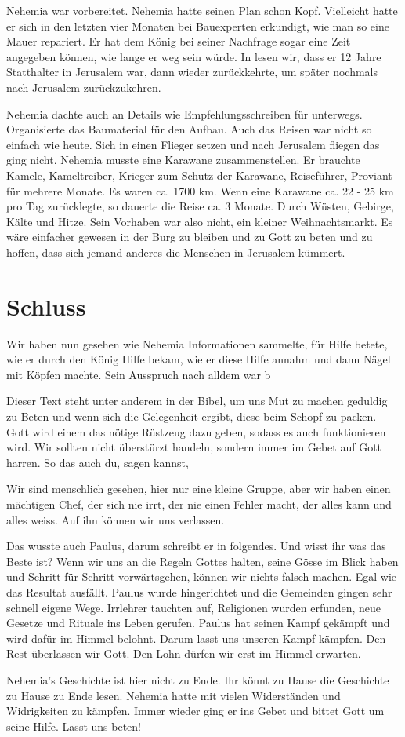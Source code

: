 \documentclass[fontsize=16pt]{mybib}
\begin{document}
Nehemia war vorbereitet. Nehemia hatte seinen Plan schon Kopf. Vielleicht hatte er sich in den letzten vier Monaten bei Bauexperten erkundigt, wie man so eine Mauer repariert. Er hat dem König bei seiner Nachfrage sogar eine Zeit angegeben können, wie lange er weg sein würde. In  lesen wir, dass er 12 Jahre Statthalter in Jerusalem war, dann wieder zurückkehrte, um später nochmals nach Jerusalem zurückzukehren.

Nehemia dachte auch an Details wie Empfehlungsschreiben für unterwegs. Organisierte das Baumaterial für den Aufbau. Auch das Reisen war nicht so einfach wie heute. Sich in einen Flieger setzen und nach Jerusalem fliegen das ging nicht. Nehemia musste eine Karawane zusammenstellen. Er brauchte Kamele, Kameltreiber,  Krieger zum Schutz der Karawane, Reiseführer, Proviant für mehrere Monate. Es waren ca. 1700 km. Wenn eine Karawane ca. 22 - 25 km pro Tag zurücklegte, so dauerte die Reise ca. 3 Monate. Durch Wüsten, Gebirge, Kälte und Hitze.
Sein Vorhaben war also nicht, ein kleiner Weihnachtsmarkt. Es wäre einfacher gewesen in der Burg zu bleiben und zu Gott zu beten und zu hoffen, dass sich jemand anderes die Menschen in Jerusalem kümmert.

\section{Schluss}


Wir haben nun gesehen wie Nehemia Informationen sammelte, für Hilfe betete, wie er durch den König Hilfe bekam, wie er diese Hilfe annahm und dann Nägel mit Köpfen machte. Sein Ausspruch nach alldem war b 

Dieser Text steht unter anderem in der Bibel, um uns Mut zu machen geduldig zu Beten und wenn sich die Gelegenheit ergibt, diese beim Schopf zu packen. Gott wird einem das nötige Rüstzeug dazu geben, sodass es auch funktionieren wird. Wir sollten nicht überstürzt handeln, sondern immer im Gebet auf Gott harren. So das auch du, sagen kannst, 

Wir sind menschlich gesehen, hier nur eine kleine Gruppe, aber wir haben einen mächtigen Chef, der sich nie irrt, der nie einen Fehler macht, der alles kann und alles weiss. Auf ihn können wir uns verlassen.

Das wusste auch Paulus, darum schreibt er in  folgendes. Und wisst ihr was das Beste ist? Wenn wir uns an die Regeln Gottes halten, seine Gösse im Blick haben und Schritt für Schritt vorwärtsgehen, können wir nichts falsch machen. Egal wie das Resultat ausfällt. Paulus wurde hingerichtet und die Gemeinden gingen sehr schnell eigene Wege. Irrlehrer tauchten auf, Religionen wurden erfunden, neue Gesetze und Rituale ins Leben gerufen. Paulus hat seinen Kampf gekämpft und wird dafür im Himmel belohnt. Darum lasst uns unseren Kampf kämpfen. Den Rest überlassen wir Gott. Den Lohn dürfen wir erst im Himmel erwarten.

Nehemia's Geschichte ist hier nicht zu Ende. Ihr könnt zu Hause die Geschichte zu Hause zu Ende lesen. Nehemia hatte mit vielen Widerständen und Widrigkeiten zu kämpfen. Immer wieder ging er ins Gebet und bittet Gott um seine Hilfe. Lasst uns beten!
\end{document}
